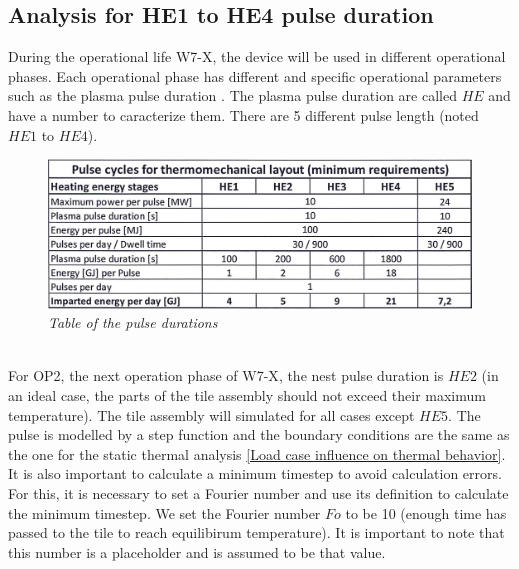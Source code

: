 \subsection{Analysis for HE1 to HE4 pulse duration}
\normalsize{During the operational life \acrshort{W7-X}, the device will be used in different operational phases. Each operational phase has different and specific operational parameters such as the plasma pulse duration \cite{Lorenz2020}. The plasma pulse duration are called $HE$ and have a number to caracterize them. There are 5 different pulse length (noted $HE1$ to $HE4$).}
\\
\begin{figure}[h!]
    \label{fig_5_12} 
    \centering
    \includegraphics[width=1\textwidth]{figures/pulselengthtable.png}
    \caption{\it Table of the pulse durations \cite{Lorenz2020}}
\end{figure}
\\
\normalsize{\indent For \acrshort{OP2}, the next operation phase of \acrshort{W7-X}, the nest pulse duration is {\bfseries $HE2$} (in an ideal case, the parts of the tile assembly should not exceed their maximum temperature). The tile assembly will simulated for all cases except $HE5$. The pulse is modelled by a step function and the boundary conditions are the same as the one for the static thermal analysis \ref{Load case influence on thermal behavior}.}
\\
\break
\normalsize{\indent It is also important to calculate a minimum timestep to avoid calculation errors. For this, it is necessary to set a Fourier number and use its definition to calculate the minimum timestep. We set the Fourier number $Fo$ to be 10 (enough time has passed to the tile to reach equilibirum temperature). It is important to note that this number is a placeholder and is assumed to be that value.}
\\
\break
